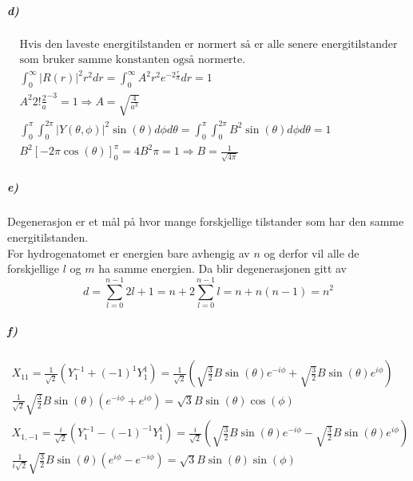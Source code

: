 \documentclass[11pt, A4paper,norsk]{article}
\begin{document}
			\subparagraph{d)}
				\begin{gather*}
\text{Hvis den laveste energitilstanden er normert så er alle senere energitilstander} \\
\text{som bruker samme konstanten også normerte.} \\
\int_{0}^{\infty} |R(r)|^2 r^2 dr = \int_{0}^{\infty} A^2 r^2 e^{- 2 \frac{r}{a}} dr = 1 \\
A^2 2! \frac{2}{a}^{-3} = 1 \Rightarrow A = \sqrt{\frac{4}{a^3}} \\
\int_{0}^{\pi} \int_{0}^{2\pi} |Y(\theta, \phi)|^2 \sin(\theta) d\phi d\theta = \int_{0}^{\pi} \int_{0}^{2\pi} B^2 \sin(\theta) d\phi d\theta = 1 \\
B^2 \left[ - 2 \pi \cos(\theta) \right]_{0}^{\pi} = 4 B^2 \pi = 1 \Rightarrow B = \frac{1}{\sqrt{4 \pi}}
				\end{gather*}










			\subparagraph{e)}
				\begin{flushleft}
Degenerasjon er et mål på hvor mange forskjellige tilstander som har den samme energitilstanden. \\
For hydrogenatomet er energien bare avhengig av $n$ og derfor  vil alle de forskjellige $l$ og $m$ ha samme energien. Da blir degenerasjonen gitt av
$$d = \sum_{l = 0}^{n - 1} 2l + 1 = n + 2 \sum_{l = 0}^{n - 1} l = n + n(n - 1) = n^2$$
				\end{flushleft}









			\subparagraph{f)}
				\begin{gather*}
X_{11} = \frac{1}{\sqrt{2}} \left( Y_{1}^{-1} + (-1)^{1} Y_{1}^{1} \right) = \frac{1}{\sqrt{2}} \left( \sqrt{\frac{3}{2}} B \sin(\theta) e^{- i \phi} + \sqrt{\frac{3}{2}} B \sin(\theta) e^{i \phi} \right) \\
\frac{1}{\sqrt{2}} \sqrt{\frac{3}{2}} B \sin(\theta) \left( e^{- i \phi} + e^{i \phi} \right) = \sqrt{3} B \sin(\theta) \cos(\phi) \\
X_{1, -1} = \frac{i}{\sqrt{2}} \left( Y_{1}^{-1} - (-1)^{-1} Y_{1}^{1} \right) = \frac{i}{\sqrt{2}} \left( \sqrt{\frac{3}{2}} B \sin(\theta) e^{- i \phi} - \sqrt{\frac{3}{2}} B \sin(\theta) e^{i \phi} \right) \\
\frac{1}{i \sqrt{2}} \sqrt{\frac{3}{2}} B \sin(\theta) \left( e^{i \phi} - e^{- i \phi} \right) = \sqrt{3} B \sin(\theta) \sin(\phi)
				\end{gather*}
\end{document}
